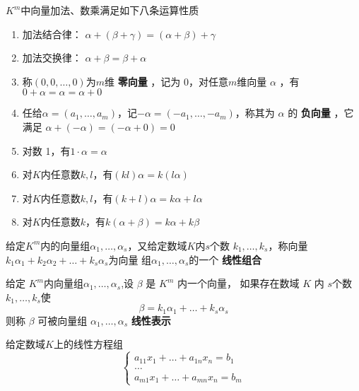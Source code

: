 \documentclass[11pt]{article}
\begin{document}
\begin{proposition}[]
\(K^m\)中向量加法、数乘满足如下八条运算性质
\begin{enumerate}
\item 加法结合律： \(\alpha+(\beta+\gamma)=(\alpha+\beta)+\gamma\)
\item 加法交换律： \(\alpha+\beta=\beta+\alpha\)
\item 称\((0,0,\dots,0)\)为\(m\)维 \textbf{零向量} ，记为 0，对任意\(m\)维向量 \(\alpha\) ，有
\(0+\alpha=\alpha=\alpha+0\)
\item 任给\(\alpha=(a_1,\dots,a_m)\)，记\(-\alpha=(-a_1,\dots,-a_m)\)，称其为 \(\alpha\)
的 \textbf{负向量} ，它满足 \(\alpha+(-\alpha)=(-\alpha+0)=0\)
\item 对数 1，有\(1\cdot\alpha=\alpha\)
\item 对\(K\)内任意数\(k,l\)，有\((kl)\alpha=k(l\alpha)\)
\item 对\(K\)内任意数\(k,l\)，有\((k+l)\alpha=k\alpha+l\alpha\)
\item 对\(K\)内任意数\(k\)，有\(k(\alpha+\beta)=k\alpha+k\beta\)
\end{enumerate}
\end{proposition}

\begin{definition}[]
给定\(K^m\)内的向量组\(\alpha_1,\dots,\alpha_s\)，又给定数域\(K\)内\(s\)个数
\(k_1,\dots,k_s\)，称向量\(k_1\alpha_1+k_2\alpha_2+\dots+k_s\alpha_s\)为向量
组\(\alpha_1,\dots,\alpha_s\)的一个 \textbf{线性组合}
\end{definition}

\begin{definition}[]
给定 \(K^m\)内向量组\(\alpha_1,\dots,\alpha_s\),设 \(\beta\) 是 \(K^m\) 内一个向量，
如果存在数域 \(K\) 内 \(s\)个数\(k_1,\dots,k_s\)使
\begin{equation*}
\beta=k_1\alpha_1+\dots+k_s\alpha_s
\end{equation*}
则称 \(\beta\) 可被向量组 \(\alpha_1,\dots,\alpha_s\) \textbf{线性表示}
\end{definition}

给定数域\(K\)上的线性方程组
\begin{equation*}
\begin{cases}
a_{11}x_1+\dots +a_{1n}x_n=b_1\\
\dots\\
a_{m1}x_1+\dots+a_{mn}x_n=b_m
\end{cases}
\end{equation*}
\end{document}
